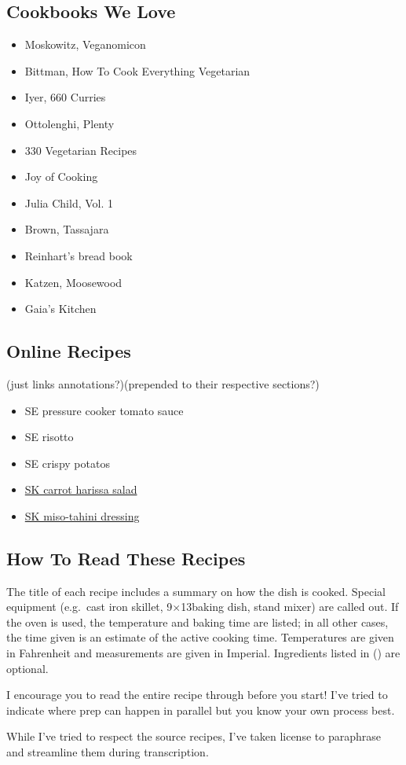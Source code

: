 \subsection{Cookbooks We Love}
\begin{itemize}
 \item Moskowitz, Veganomicon
 \item Bittman, How To Cook Everything Vegetarian
 \item Iyer, 660 Curries
 \item Ottolenghi, Plenty
 \item 330 Vegetarian Recipes
 \item Joy of Cooking
 \item Julia Child, Vol. 1
 \item Brown, Tassajara
 \item Reinhart’s bread book
 \item Katzen, Moosewood
 \item Gaia’s Kitchen
\end{itemize}

\subsection{Online Recipes}
(just links \And annotations?)(prepended to their respective sections?)
\begin{itemize}
 \item SE pressure cooker tomato sauce
 \item SE risotto
 \item SE crispy potatos
 \item \href{https://smittenkitchen.com/2010/05/carrot-salad-with-harissa-feta-and-mint/}{SK carrot harissa salad}
 \item \href{https://smittenkitchen.com/2013/10/miso-sweet-potato-and-broccoli-bowl/}{SK miso-tahini dressing}
\end{itemize}

\subsection{How To Read These Recipes}
The title of each recipe includes a summary on how the dish is cooked. Special equipment (e.g.\ cast iron skillet, 9\inch$\times$13\inch baking dish, stand mixer) are called out. If the oven is used, the temperature and baking time are listed; in all other cases, the time given is an estimate of the active cooking time. Temperatures are given in Fahrenheit and measurements are given in Imperial. Ingredients listed in () are optional.

I encourage you to read the entire recipe through before you start! I've tried to indicate where prep can happen in parallel but you know your own process best.

While I've tried to respect the source recipes, I've taken license to paraphrase and streamline them during transcription.
